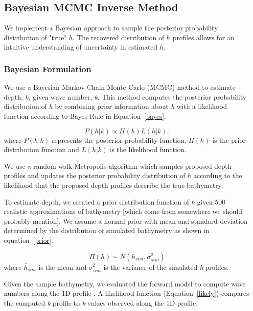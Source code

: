 \subsection{Bayesian MCMC Inverse Method}
We implement a Bayesian approach to sample the posterior probability distribution of "true" $h$. The recovered distribution of $h$ profiles allows for an intuitive understanding of uncertainty in estimated $h$.

\subsubsection{Bayesian Formulation}

We use a Bayesian Markov Chain Monte Carlo (MCMC) method to estimate depth, \textit{h}, given wave number, \textit{k}. %
This method computes the posterior probability distribution of \textit{h} by combining prior information about \textit{h} with a likelihood function according to Bayes Rule in Equation~\ref{bayes}: 


\begin{equation}\label{bayes}
P(h|%
k) \propto \Pi(h)L(h|%
k),
\end{equation} 
where $P(h|%
k)$ represents the posterior probability function, $\Pi(h)$ is the prior distribution function and $L(h|%
k)$ is the likelihood function.

We use a random walk Metropolis algorithm \citep{Metropolis1953} which samples proposed depth profiles and updates the posterior probability distribution of \textit{h} according to the likelihood that the proposed depth profiles describe the true bathymetry. 

To estimate depth, we created a prior distribution function of \textit{h} given 500 realistic approximations of bathymetry [which come from somewhere we should probably mention].  We assume a normal prior with mean and standard deviation determined by the distribution of simulated bathymetry as shown in equation~\ref{prior}. 

\begin{equation}\label{prior}
\Pi(h) \sim N(\bar{h}_{sim},\sigma_{sim}^2)
\end{equation}
where $\bar{h}_{sim}$ is the mean and $\sigma_{sim}^2$ is the variance of the simulated \textit{h} profiles. 

Given the sample bathymetry, we evaluated the forward model to compute wave numbers along the 1D profile%
. A likelihood function (Equation~\ref{likely}) compares the computed \textit{k} profile to \textit{k} values observed along the 1D profile. 


